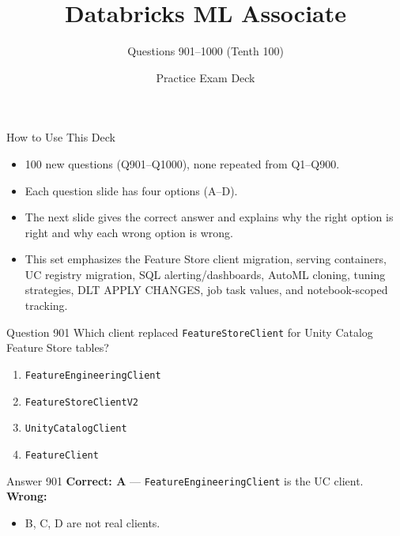 \documentclass[aspectratio=169,11pt]{beamer}
\title{Databricks ML Associate}
\subtitle{Questions 901--1000 (Tenth 100)}
\author{Practice Exam Deck}
\date{}
\begin{document}
	
	\begin{frame}
		\titlepage
	\end{frame}
	
	\begin{frame}{How to Use This Deck}
		\begin{itemize}
			\item 100 new questions (Q901--Q1000), none repeated from Q1--Q900.
			\item Each question slide has four options (A--D).
			\item The next slide gives the correct answer and explains why the right option is right and why each wrong option is wrong.
			\item This set emphasizes the Feature Store client migration, serving containers, UC registry migration, SQL alerting/dashboards, AutoML cloning, tuning strategies, DLT APPLY CHANGES, job task values, and notebook-scoped tracking.
		\end{itemize}
	\end{frame}
	
	\begin{frame}{Question 901}
		Which client replaced \texttt{FeatureStoreClient} for Unity Catalog Feature Store tables?
		\begin{enumerate}[label=\Alph*.]
			\item \texttt{FeatureEngineeringClient}
			\item \texttt{FeatureStoreClientV2}
			\item \texttt{UnityCatalogClient}
			\item \texttt{FeatureClient}
		\end{enumerate}
	\end{frame}
	\begin{frame}{Answer 901}
		\textbf{Correct: A} --- \texttt{FeatureEngineeringClient} is the UC client.\\
		\vspace{0.5em}
		\textbf{Wrong:}
		\begin{itemize}
			\item B, C, D are not real clients.
		\end{itemize}
	\end{frame}
	
\end{document}

